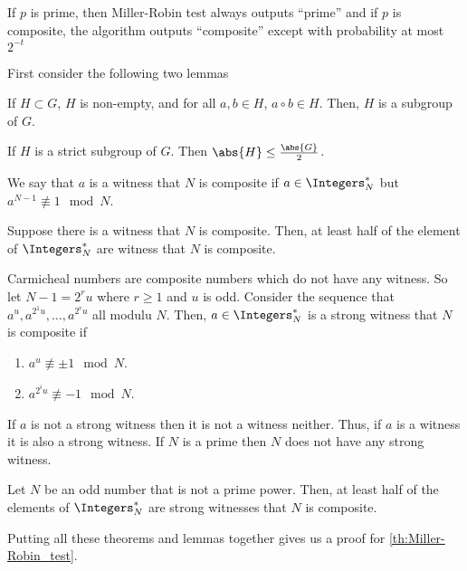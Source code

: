 \begin{theorem}\label{th:Miller-Robin_test}
    If \(p\) is prime, then Miller-Robin test always outputs ``prime'' and if \(p\) is composite, the algorithm outputs ``composite'' except with probability at most \(2^{-t}\)
\end{theorem}

First consider the following two lemmas 
\begin{lemma}
    If \(H \subset G\), \(H\) is non-empty, and for all \(a,b \in H\), \(a \circ b \in H\). Then, \(H\) is a subgroup of \(G\).
\end{lemma}
\begin{lemma}
    If \(H\) is a strict subgroup of \(G\). Then \(\abs{H} \leq \frac{\abs{G}}{2}\).
\end{lemma}

We say that \(a\) is a witness that \(N\) is composite if \(a \in \Integers_N^{\ast}\) but \(a^{N - 1} \not \equiv 1 \mod N\). 
\begin{theorem}
    Suppose there is a witness that \(N\) is composite. Then, at least half of the element of \(\Integers_{N}^{\ast}\) are witness that \(N\) is composite. 
\end{theorem}

Carmicheal numbers are composite numbers which do not have any witness. So let \(N - 1 = 2^r u \) where \(r\geq 1\) and \(u\) is odd. Consider the sequence that \(a^u, a^{2^1 u}, \dots , a^{2^{r}u}\) all modulu \(N\). Then, \(a \in \Integers_N^{\ast}\) is a strong witness that \(N\) is composite if
\begin{enumerate}
    \item \(a^{u} \not \equiv \pm 1 \mod N\). 
    \item \(a^{2^i u} \not \equiv -1 \mod N\).
\end{enumerate}
If \(a\) is not a strong witness then it is not a witness neither. Thus, if \(a\) is a witness it is also a strong witness. If \(N\) is a prime then \(N\) does not have any strong witness.

\begin{theorem}
    Let \(N\) be an odd number that is not a prime power. Then, at least half of the elements of \(\Integers_N^{\ast}\) are strong witnesses that \(N\) is composite.
\end{theorem}

Putting all these theorems and lemmas together gives us a proof for \ref{th:Miller-Robin_test}.